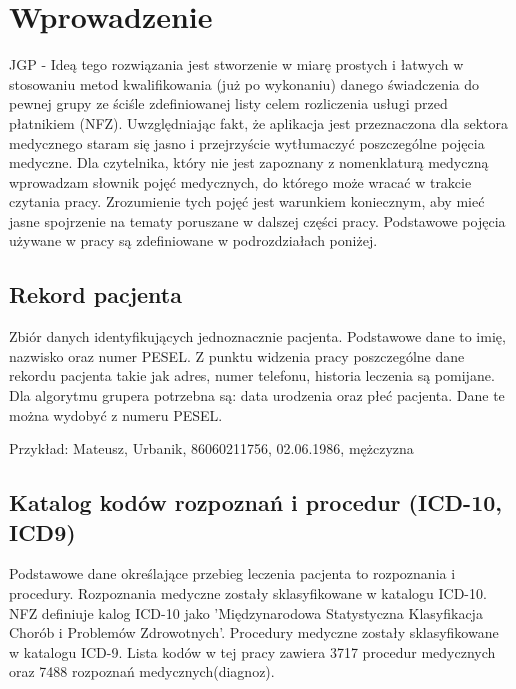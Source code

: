 \chapter{Wprowadzenie}
\label{cha:wprowadzenie}

JGP - Ideą tego rozwiązania jest stworzenie w miarę prostych i łatwych w stosowaniu metod kwalifikowania (już po wykonaniu) danego świadczenia do pewnej grupy ze ściśle zdefiniowanej listy celem rozliczenia usługi przed płatnikiem (NFZ).
Uwzględniając fakt, że aplikacja jest przeznaczona dla sektora medycznego staram się jasno i przejrzyście wytłumaczyć poszczególne pojęcia medyczne. Dla czytelnika, który nie jest zapoznany z nomenklaturą medyczną wprowadzam słownik pojęć medycznych, do którego może wracać w trakcie czytania pracy.
Zrozumienie tych pojęć jest warunkiem koniecznym, aby mieć jasne spojrzenie na tematy poruszane w dalszej części pracy. Podstawowe pojęcia używane w pracy są zdefiniowane w podrozdziałach poniżej.  


\section{Rekord pacjenta}
\label{sec:rekordPacjenta}

Zbiór danych identyfikujących jednoznacznie pacjenta. Podstawowe dane to imię, nazwisko oraz numer PESEL. Z punktu widzenia pracy poszczególne dane rekordu pacjenta takie jak adres, numer telefonu, historia leczenia są pomijane. Dla algorytmu grupera potrzebna są: data urodzenia oraz płeć pacjenta. Dane te można wydobyć z numeru PESEL.

Przykład:
Mateusz, Urbanik, 86060211756, 02.06.1986, mężczyzna


\section{Katalog kodów rozpoznań i procedur (ICD-10, ICD9)}
\label{sec:kodyICD}

Podstawowe dane określające przebieg leczenia pacjenta to rozpoznania i procedury. Rozpoznania medyczne zostały sklasyfikowane w katalogu ICD-10. NFZ definiuje kalog ICD-10 jako 'Międzynarodowa Statystyczna Klasyfikacja Chorób i Problemów Zdrowotnych'.
Procedury medyczne zostały sklasyfikowane w katalogu ICD-9. Lista kodów w tej pracy zawiera 3717 procedur medycznych oraz 7488 rozpoznań medycznych(diagnoz).


